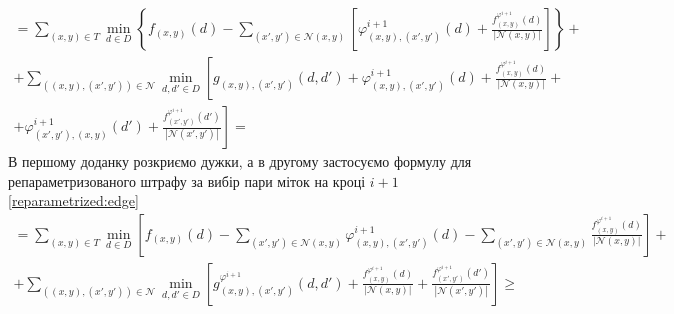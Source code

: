 \begin{equation*}
\begin{gathered}
    = \sum \limits_{\left(x, y \right) \in T}
        \min \limits_{d \in D} \left\{
            f_{ \left(x, y \right)} \left( d \right) -
            \sum \limits_{\left(x', y' \right) \in \mathcal{N}\left(x, y \right)}
            \left[
                \varphi_{\left(x, y \right), \left(x', y' \right)}^{i + 1}
                    \left( d \right) +
                \frac{f_{\left(x, y \right)}^{\varphi^{i + 1}} \left( d \right)}{\left| \mathcal{N} \left(x, y \right) \right|}
            \right]
        \right\} + \\
    + \sum \limits_{\left( \left(x, y \right), \left(x', y' \right) \right) \in \mathcal{N}}
        \min \limits_{d, d' \in D} \left[
            g_{\left(x, y \right), \left(x', y' \right)} \left( d, d' \right) +
            \varphi_{\left(x, y \right), \left(x', y' \right)}^{i + 1}
                \left( d \right) +
            \frac{f_{\left( x, y \right)}^{\varphi^{i + 1}} \left( d \right)}{\left| \mathcal{N}\left( x, y \right) \right|}
            + \right. \\
            \left. + \varphi_{\left(x', y' \right), \left(x, y \right)}^{i + 1}
                \left( d' \right) +
            \frac{f_{\left( x', y' \right)}^{\varphi^{i + 1}} \left( d' \right)}{\left| \mathcal{N}\left( x', y' \right) \right|}
        \right] =
\end{gathered}
\end{equation*}
В першому доданку розкриємо дужки,
а в другому застосуємо формулу для репараметризованого штрафу за вибір пари
міток на кроці $i + 1$
\eqref{reparametrized:edge}
\begin{equation*}
\begin{gathered}
    = \sum \limits_{\left(x, y \right) \in T}
        \min \limits_{d \in D} \left[
            f_{\left(x, y \right)} \left( d \right) -
            \sum \limits_{\left(x' ,y' \right) \in \mathcal{N}\left( x, y \right)}
                \varphi_{\left(x, y \right), \left(x', y' \right)}^{i + 1}
                    \left( d \right) -
            \sum \limits_{\left(x', y' \right) \in \mathcal{N}\left( x, y \right)}
                \frac{f_{\left( x, y \right)}^{\varphi^{i + 1}}\left( d \right)}{\left|\mathcal{N}\left(x, y \right) \right|}
        \right] + \\
    + \sum \limits_{\left( \left(x, y \right), \left(x', y' \right) \right) \in \mathcal{N}}
        \min \limits_{d, d' \in D} \left[
            g_{\left(x, y \right), \left(x', y' \right)}^{\varphi^{i + 1}}
                \left( d, d'\right) +
            \frac{f_{\left(x, y \right)}^{\varphi^{i + 1}}\left( d \right)}{\left| \mathcal{N}\left(x, y \right) \right|} +
            \frac{f_{\left(x', y' \right)}^{\varphi^{i + 1}}\left( d' \right)}{\left| \mathcal{N}\left(x', y' \right) \right|}
        \right] \ge
\end{gathered}
\end{equation*}
